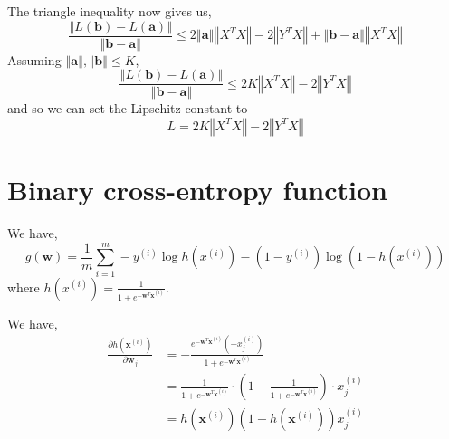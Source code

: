 \documentclass[sigconf,authordraft]{acmart}
\begin{document}
The triangle inequality now gives us,
\[
    \frac{\left\Vert L(\textbf{b}) - L(\textbf{a}) \right\Vert}{\left\Vert \textbf{b} - \textbf{a} \right\Vert} \leq 2 \left\Vert \textbf{a} \right\Vert \left\Vert X^T X \right\Vert - 2\left\Vert Y^T X \right\Vert + \left\Vert \textbf{b} - \textbf{a} \right\Vert \left\Vert X^T X \right\Vert
\]
Assuming $\left\Vert \textbf{a} \right\Vert, \left\Vert \textbf{b} \right\Vert \leq K$,
\[
    \frac{\left\Vert L(\textbf{b}) - L(\textbf{a}) \right\Vert}{\left\Vert \textbf{b} - \textbf{a} \right\Vert} \leq 2K \left\Vert X^T X \right\Vert - 2 \left\Vert Y^T X \right\Vert
\]
and so we can set the Lipschitz constant to
\[
    \boxed{
        L = 2K \left\Vert X^T X \right\Vert - 2 \left\Vert Y^T X \right\Vert
    }
\]
\section{Binary cross-entropy function}
We have,
\[
    g(\textbf{w}) = \frac{1}{m}\sum\limits_{i=1}^m -y^{(i)}\log h(x^{(i)}) - (1-y^{(i)})\log \left( 1 - h(x^{(i)}) \right) 
\]
where $h(x^{(i)}) = \frac{1}{1+e^{-\textbf{w}^T \textbf{x}^{(i)}}}$.

We have,
\[
    \begin{aligned}
        \frac{\partial h(\textbf{x}^{(i)})}{\partial \textbf{w}_j} &= -\frac{e^{-\textbf{w}^T \textbf{x}^{(i)}} \left( -x^{(i)}_j \right)}{1+e^{-\textbf{w}^T \textbf{x}^{(i)}}} \\
        &= \frac{1}{1+e^{-\textbf{w}^T \textbf{x}^{(i)}}}\cdot \left( 1 - \frac{1}{1+e^{-\textbf{w}^T \textbf{x}^{(i)}}} \right) \cdot x^{(i)}_j \\
        &= h(\textbf{x}^{(i)}) \left( 1 - h(\textbf{x}^{(i)}) \right)x^{(i)}_j
    \end{aligned}
\]
\end{document}
